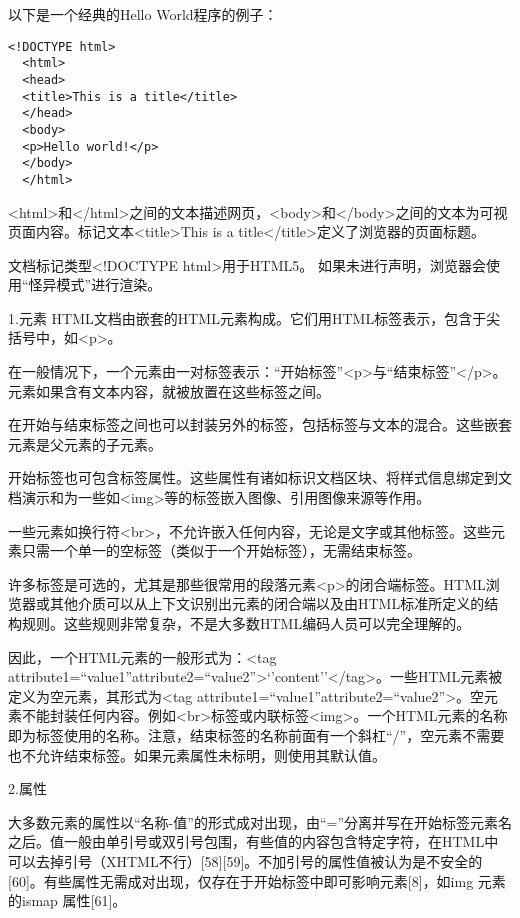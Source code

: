 \documentclass[
]{article}
\begin{document}
以下是一个经典的Hello World程序的例子：

\begin{verbatim}
<!DOCTYPE html>
  <html>
  <head>
  <title>This is a title</title>
  </head>
  <body>
  <p>Hello world!</p>
  </body>
  </html>
\end{verbatim}

\textless html\textgreater 和\textless/html\textgreater 之间的文本描述网页，\textless body\textgreater 和\textless/body\textgreater 之间的文本为可视页面内容。标记文本\textless title\textgreater This
is a title\textless/title\textgreater 定义了浏览器的页面标题。

文档标记类型\textless!DOCTYPE html\textgreater 用于HTML5。
如果未进行声明，浏览器会使用``怪异模式''进行渲染。

1.元素
HTML文档由嵌套的HTML元素构成。它们用HTML标签表示，包含于尖括号中，如\textless p\textgreater。

在一般情况下，一个元素由一对标签表示：``开始标签''\textless p\textgreater 与``结束标签''\textless/p\textgreater。元素如果含有文本内容，就被放置在这些标签之间。

在开始与结束标签之间也可以封装另外的标签，包括标签与文本的混合。这些嵌套元素是父元素的子元素。

开始标签也可包含标签属性。这些属性有诸如标识文档区块、将样式信息绑定到文档演示和为一些如\textless img\textgreater 等的标签嵌入图像、引用图像来源等作用。

一些元素如换行符\textless br\textgreater，不允许嵌入任何内容，无论是文字或其他标签。这些元素只需一个单一的空标签（类似于一个开始标签），无需结束标签。

许多标签是可选的，尤其是那些很常用的段落元素\textless p\textgreater 的闭合端标签。HTML浏览器或其他介质可以从上下文识别出元素的闭合端以及由HTML标准所定义的结构规则。这些规则非常复杂，不是大多数HTML编码人员可以完全理解的。

因此，一个HTML元素的一般形式为：\textless tag
attribute1=``value1''attribute2=``value2''\textgreater{}`'content''\textless/tag\textgreater。一些HTML元素被定义为空元素，其形式为\textless tag
attribute1=``value1''attribute2=``value2''\textgreater。空元素不能封装任何内容。例如\textless br\textgreater 标签或内联标签\textless img\textgreater。一个HTML元素的名称即为标签使用的名称。注意，结束标签的名称前面有一个斜杠``/''，空元素不需要也不允许结束标签。如果元素属性未标明，则使用其默认值。

2.属性

大多数元素的属性以``名称-值''的形式成对出现，由``=''分离并写在开始标签元素名之后。值一般由单引号或双引号包围，有些值的内容包含特定字符，在HTML中可以去掉引号（XHTML不行）{[}58{]}{[}59{]}。不加引号的属性值被认为是不安全的{[}60{]}。有些属性无需成对出现，仅存在于开始标签中即可影响元素{[}8{]}，如img
元素的ismap 属性{[}61{]}。
\end{document}
